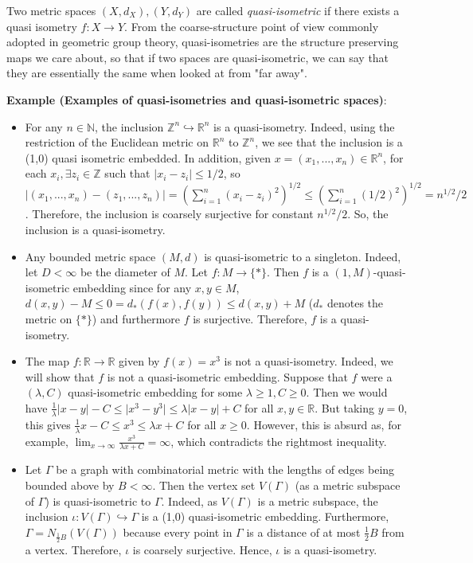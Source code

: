 \documentclass[12pt]{article}
\newcommand{\vs}{\vskip10pt}
\begin{document}
 	Two metric spaces $(X, d_X), (Y, d_Y)$ are called \textit{quasi-isometric} if there exists a quasi isometry $f: X \rightarrow Y$. From the coarse-structure point of view commonly adopted in geometric group theory, quasi-isometries are the structure preserving maps we care about, so that if two spaces are quasi-isometric, we can say that they are essentially the same when looked at from "far away". 
 
 	\vs 
 	
 	\textbf{Example (Examples of quasi-isometries and quasi-isometric spaces)}:
 	
 	\begin{itemize}
 		\item For any $n \in \mathbb{N}$, the inclusion $\mathbb{Z}^n \hookrightarrow \mathbb{R}^n$ is a quasi-isometry. Indeed, using the restriction of the Euclidean metric on $\mathbb{R}^n$ to $\mathbb{Z}^n$, we see that the inclusion is a (1,0) quasi isometric embedded. In addition, given $x = (x_1,...,x_n) \in \mathbb{R}^n$, for each $x_i, \exists z_i \in \mathbb{Z}$ such that $\vert x_i - z_i \vert \leq 1/2$, so $\vert(x_1,...,x_n) - (z_1,...,z_n) \vert = (\sum_{i=1}^n (x_i - z_i)^2)^{1/2} \leq (\sum_{i=1}^n (1/2)^2)^{1/2} = n^{1/2}/2$. Therefore, the inclusion is coarsely surjective for constant $n^{1/2}/2$. So, the inclusion is a quasi-isometry. 
 		\item Any bounded metric space $(M,d)$ is quasi-isometric to a singleton. Indeed, let $D < \infty$ be the diameter of $M$. Let $f: M \rightarrow \{*\}$. Then $f$ is a $(1, M)$-quasi-isometric embedding since for any $x,y \in M$, $d(x,y) - M \leq 0 = d_*(f(x), f(y)) \leq d(x,y) + M$ ($d_*$ denotes the metric on $\{*\}$) and furthermore $f$ is surjective. Therefore, $f$ is a quasi-isometry. 
 		\item The map $f: \mathbb{R} \rightarrow \mathbb{R}$ given by $f(x) = x^3$ is not a quasi-isometry. Indeed, we will show that $f$ is not a quasi-isometric embedding. Suppose that $f$ were a $(\lambda, C)$ quasi-isometric embedding for some $\lambda \geq 1, C \geq 0$. Then we would have $\frac{1}{\lambda} \vert x - y \vert - C \leq \vert x^3 - y^3 \vert \leq \lambda \vert x - y \vert + C$ for all $x,y \in \mathbb{R}$. But taking $y = 0$, this gives $\frac{1}{\lambda}x - C \leq x^3 \leq \lambda x + C$ for all $x \geq 0$. However, this is absurd as, for example, $\lim_{x \rightarrow \infty} \frac{x^3}{\lambda x + C} = \infty$, which contradicts the rightmost inequality. 
 		\item Let $\Gamma$ be a graph with combinatorial metric with the lengths of edges being bounded above by $B < \infty$. Then the vertex set $V(\Gamma)$ (as a metric subspace of $\Gamma$) is quasi-isometric to $\Gamma$. Indeed, as $V(\Gamma)$ is a metric subspace, the inclusion $\iota: V(\Gamma) \hookrightarrow \Gamma$ is a (1,0) quasi-isometric embedding. Furthermore, $\Gamma = N_{\frac{1}{2} B} (V(\Gamma))$ because every point in $\Gamma$ is a distance of at most $\frac{1}{2} B$ from a vertex. Therefore, $\iota$ is coarsely surjective. Hence, $\iota$ is a quasi-isometry.
 	\end{itemize}
 
\end{document}
